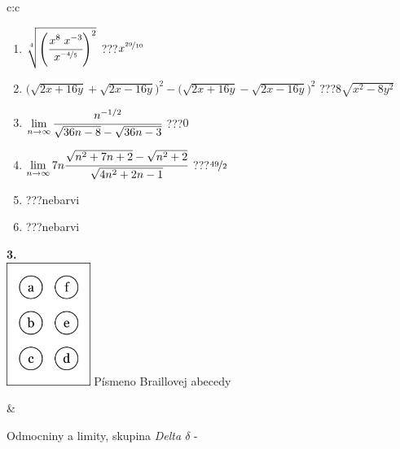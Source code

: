 \documentclass[10pt]{report}
\begin{document}
\begin{tabular}{c:c}
\begin{minipage}[c][104.5mm][t]{0.5\linewidth}
\begin{center}
\begin{minipage}{0.79\linewidth}
\begin{center}
\begin{varwidth}{\linewidth}
\begin{enumerate}
\small
\item $\sqrt[4]{\left(\cfrac{x^{8}\;x^{-3}}{x^{\nicefrac{-4}{5}}}\right)^{2}}$\quad \dotfill\; ???\;\dotfill \quad $x^{\nicefrac{29}{10}}$
\item {\footnotesize{\scriptsize$\big(\sqrt{2x+16y}+\sqrt{2x-16y}\big)^2-\big(\sqrt{2x+16y}-\sqrt{2x-16y}\big)^2$}\quad \dotfill\; ???\;\dotfill \quad $8\sqrt{x^2-8y^2}$}
\item $\lim\limits_{n\to\infty}\cfrac{n^{-1/2}}{\sqrt{36n-8}-\sqrt{36n-3}}$\quad \dotfill\; ???\;\dotfill \quad $0$
\item $\lim\limits_{n\to\infty}7n\cfrac{\sqrt{n^2+7n+2}-\sqrt{n^2+2}}{\sqrt{4n^2+2n-1}}$\quad \dotfill\; ???\;\dotfill \quad $\nicefrac{49}{2}$
\item \quad \dotfill\; ???\;\dotfill \quad nebarvi
\item \quad \dotfill\; ???\;\dotfill \quad nebarvi
\end{enumerate}
\end{varwidth}
\end{center}
\end{minipage}
\begin{minipage}{0.20\linewidth}
\begin{center}
{\Huge\bfseries 3.} \\[2mm]
\includegraphics[height=40mm]{../images/braille.png}
{\small Písmeno Braillovej abecedy}
\end{center}
\end{minipage}
\end{center}
\end{minipage}
&
\begin{minipage}[c][104.5mm][t]{0.5\linewidth}
\begin{center}
\vspace{7mm}
{\huge Odmocniny a limity, skupina \textit{Delta $\delta$} -}\\[5mm]

\end{center}
\end{minipage}
\end{tabular}
\end{document}
